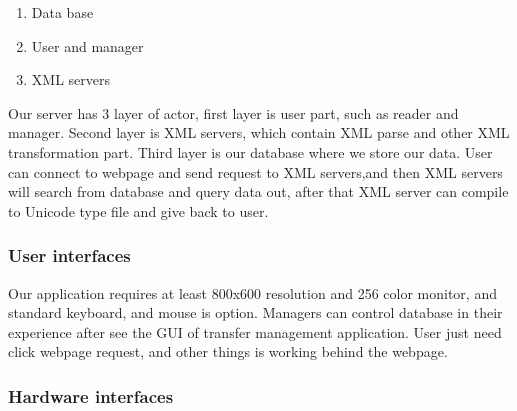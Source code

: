 \begin{enumerate}
  \item Data base
  \item User and manager
  \item XML servers
\end{enumerate}

Our server has 3 layer of actor, first layer is user part, such as reader and manager.
Second layer is XML servers, which contain XML parse and other XML transformation part.
Third layer is our database where we store our data.
User can connect to webpage and send request to XML servers,and then XML servers will search from database and query data out, after that XML server can compile to Unicode type file and give back to user.

\subsubsection{User interfaces}

Our application requires at least 800x600 resolution and 256 color monitor, and standard keyboard, and mouse is option.
Managers can control database in their experience after see the GUI of transfer management application.
User just need click webpage request, and other things is working behind the webpage.

\subsubsection{Hardware interfaces}

